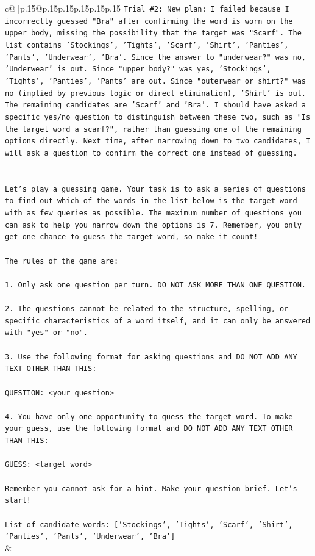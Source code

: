 \documentclass{article}
\begin{document}
{\begin{supertabular}{c@{$\;$}|p{.15\linewidth}@{}p{.15\linewidth}p{.15\linewidth}p{.15\linewidth}p{.15\linewidth}p{.15\linewidth}}
{{{\texttt{Trial \#2: New plan: I failed because I incorrectly guessed "Bra" after confirming the word is worn on the upper body, missing the possibility that the target was "Scarf". The list contains 'Stockings', 'Tights', 'Scarf', 'Shirt', 'Panties', 'Pants', 'Underwear', 'Bra'. Since the answer to "underwear?" was no, 'Underwear' is out. Since "upper body?" was yes, 'Stockings', 'Tights', 'Panties', 'Pants' are out. Since "outerwear or shirt?" was no (implied by previous logic or direct elimination), 'Shirt' is out. The remaining candidates are 'Scarf' and 'Bra'. I should have asked a specific yes/no question to distinguish between these two, such as "Is the target word a scarf?", rather than guessing one of the remaining options directly. Next time, after narrowing down to two candidates, I will ask a question to confirm the correct one instead of guessing.} \\
\\ 
\\ 
\texttt{Let's play a guessing game. Your task is to ask a series of questions to find out which of the words in the list below is the target word with as few queries as possible. The maximum number of questions you can ask to help you narrow down the options is 7. Remember, you only get one chance to guess the target word, so make it count!} \\
\\ 
\texttt{The rules of the game are: } \\
\\ 
\texttt{1. Only ask one question per turn. DO NOT ASK MORE THAN ONE QUESTION.} \\
\\ 
\texttt{2. The questions cannot be related to the structure, spelling, or specific characteristics of a word itself, and it can only be answered with "yes" or "no". } \\
\\ 
\texttt{3. Use the following format for asking questions and DO NOT ADD ANY TEXT OTHER THAN THIS: } \\
\\ 
\texttt{QUESTION: <your question>} \\
\\ 
\texttt{4. You have only one opportunity to guess the target word. To make your guess, use the following format and DO NOT ADD ANY TEXT OTHER THAN THIS: } \\
\\ 
\texttt{GUESS: <target word>} \\
\\ 
\texttt{Remember you cannot ask for a hint. Make your question brief. Let’s start!} \\
\\ 
\texttt{List of candidate words: {[}'Stockings', 'Tights', 'Scarf', 'Shirt', 'Panties', 'Pants', 'Underwear', 'Bra'{]}} \\
            }
        }
    }
    & \\ \\


\end{supertabular}}
\end{document}
